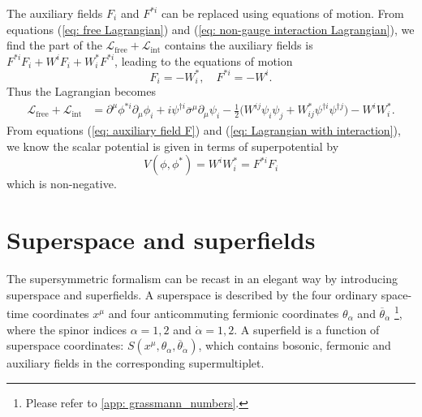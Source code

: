 \documentclass[12pt]{report}
\begin{document}
The auxiliary fields $F_{i}$ and $F^{*i}$ can be replaced using equations of motion.
From equations (\ref{eq: free Lagrangian}) and (\ref{eq: non-gauge interaction Lagrangian}), we find the part of the $\mathcal{L}_{\mathrm{free}} + \mathcal{L}_{\mathrm{int}}$ contains the auxiliary fields is $F^{*i} F_{i} + W^{i} F_{i} + W^{*}_{i} F^{*i}$, leading to the equations of motion
\begin{equation} \label{eq: auxiliary field F}
F_{i} = - W^{*}_{i}, \quad 
F^{*i} = - W^{i} .
\end{equation}
Thus the Lagrangian becomes
\begin{align} \label{eq: Lagrangian with interaction}
\mathcal{L}_{\mathrm{free}} + \mathcal{L}_{\mathrm{int}} 
&= \partial^{\mu} \phi^{*i} \partial_{\mu} \phi_{i} + i \psi^{\dag i} \overline{\sigma}^{\mu} \partial_{\mu} \psi_{i} -\frac{1}{2} \Big( W^{ij} \psi_{i} \psi_{j} + W^{*}_{ij} \psi^{\dag i} \psi^{\dag j} \Big) - W^{i} W^{*}_{i} .
\end{align}
From equations (\ref{eq: auxiliary field F}) and (\ref{eq: Lagrangian with interaction}), we know the scalar potential is given in terms of superpotential by
\begin{equation}
V(\phi, \phi^{*}) = W^{i}W^{*}_{i} = F^{*i} F_{i}
\end{equation}
which is non-negative.


\chapter{Superspace and superfields}
The supersymmetric formalism can be recast in an elegant way by introducing superspace and superfields.
A superspace is described by the four ordinary space-time coordinates $x^{\mu}$ and four anticommuting fermionic coordinates $\theta_{\alpha}$ and $\overline{\theta}_{\dot{\alpha}}$ \footnote{Please refer to \ref{app: grassmann_numbers}.}, where the spinor indices $\alpha = 1, 2$ and $\dot{\alpha} = 1, 2$.
A superfield is a function of superspace coordinates: $S (x^{\mu}, \theta_{\alpha}, \overline{\theta}_{\dot{\alpha}})$, which contains bosonic, fermonic and auxiliary fields in the corresponding supermultiplet.
\end{document}
